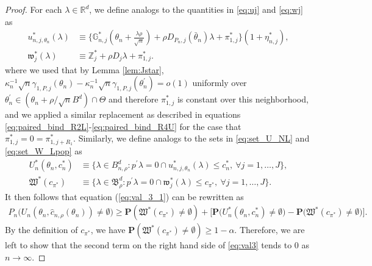\documentclass[letterpaper,11pt]{article}
\theoremstyle{myplain}
\theoremstyle{mydefinition}
\theoremstyle{myremark}
\newcommand{\HH}{\mathbb{Z}}
\newcommand{\R}{\mathbb{R}}
\newcommand{\tlarhon}{\tfrac{\lambda \rho }{\sqrt n}}
\newcommand{\thetnprime}{(\theta_n +\rho /\sqrt{n} B^d)\cap \Theta}
\numberwithin{equation}{section}
\numberwithin{figure}{section}
\begin{document}
\begin{appendices}
\begin{proof}
For each $\lambda\in\R^d$, we define analogs to the quantities in \eqref{eq:uj} and \eqref{eq:wj} as
\begin{align}
u^*_{n,j,\theta_n}(\lambda)&\equiv	\bigl\{\mathbb G^*_{n,j}(\theta_n+\tlarhon)+\rho D_{P_{n},j}(\bar\theta_n)\lambda+\pi^*_{1,j}\bigr\}(1+\eta^*_{n,j}),\label{eq:ujstar}\\
\mathfrak{w}^*_{j}(\lambda)&\equiv \HH^*_{j}+\rho D_{j}\lambda+\pi^*_{1,j}.\label{eq:wjstar}
\end{align}
 where we used that by Lemma \ref{lem:Jstar}, $\kappa_n^{-1}\sqrt{n} \gamma_{1,P,j}(\theta_n)-\kappa_n^{-1}\sqrt{n} \gamma_{1,P,j}(\theta_n^\prime)=o(1)$ uniformly over $\theta_n^\prime \in \thetnprime$ and therefore $\pi_{1,j}^*$ is constant over this neighborhood, and we applied a similar replacement as described in equations \eqref{eq:paired_bind_R2L}-\eqref{eq:paired_bind_R4U} for the case that $\pi_{1,j}^*=0=\pi_{1,j+R_1}^*$.
Similarly, we define analogs to the sets in \eqref{eq:set_U_NL} and \eqref{eq:set_W_Lpop} as
\begin{align}
U^*_{n}(\theta_{n},c_{n}^{*})&\equiv	\big\{\lambda\in B^d_{n,\rho}: p^\prime \lambda = 0 \cap u^*_{n,j,\theta_n}(\lambda)\le c_{n}^{*}, \: \forall j=1,\dots,J\big\}, \label{eq:set_U_NL_star}\\
\mathfrak W^*(c_{\pi^*})&\equiv \big\{ \lambda\in \mathfrak B^d_\rho: p^\prime \lambda = 0 \cap \mathfrak{w}^*_{j}(\lambda)\le c_{\pi^*},~\forall j=1,\dots,J\big\}.\label{eq:set_W_Lpop_star}
\end{align}
 It then follows that equation (\ref{eq:val_3_1}) can be rewritten as
\begin{align}
P_{n}\Big(U_{n}(\theta_{n},\hat{c}_{n,\rho}(\theta_{n}))\neq \emptyset\Big)\ge \mathbf P(\mathfrak{W}^*(c_{\pi^*})\ne\emptyset)+\Big[ \mathbf P\Big(U^*_{n}(\theta_{n},c^*_n)\ne\emptyset\Big)-	\mathbf P\Big(\mathfrak{W}^*(c_{\pi^*})\ne\emptyset\Big)\Big].\label{eq:val3}
\end{align} 
By the definition of $c_{\pi^*}$, we have $\mathbf P(\mathfrak{W}^*(c_{\pi^*})\ne\emptyset)\ge 1-\alpha$. Therefore, we are left to show that the second term on the right hand side of \eqref{eq:val3} tends to 0 as $n\to\infty$.


\end{proof}
\end{appendices}
\end{document}

